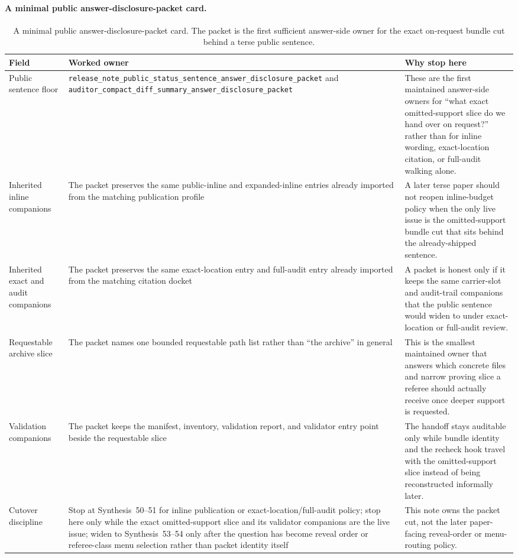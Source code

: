 \documentclass[11pt]{article}
\begin{document}
\paragraph{A minimal public answer-disclosure-packet card.}
\begin{table}[t]
\centering
\small
\begin{tabularx}{\linewidth}{@{}lX X@{}}
\toprule
Field & Worked owner & Why stop here \\
\midrule
Public sentence floor & \nolinkurl{release_note_public_status_sentence_answer_disclosure_packet} and \nolinkurl{auditor_compact_diff_summary_answer_disclosure_packet} & These are the first maintained answer-side owners for ``what exact omitted-support slice do we hand over on request?'' rather than for inline wording, exact-location citation, or full-audit walking alone. \\
Inherited inline companions & The packet preserves the same public-inline and expanded-inline entries already imported from the matching publication profile & A later terse paper should not reopen inline-budget policy when the only live issue is the omitted-support bundle cut that sits behind the already-shipped sentence. \\
Inherited exact and audit companions & The packet preserves the same exact-location entry and full-audit entry already imported from the matching citation docket & A packet is honest only if it keeps the same carrier-slot and audit-trail companions that the public sentence would widen to under exact-location or full-audit review. \\
Requestable archive slice & The packet names one bounded requestable path list rather than ``the archive'' in general & This is the smallest maintained owner that answers which concrete files and narrow proving slice a referee should actually receive once deeper support is requested. \\
Validation companions & The packet keeps the manifest, inventory, validation report, and validator entry point beside the requestable slice & The handoff stays auditable only while bundle identity and the recheck hook travel with the omitted-support slice instead of being reconstructed informally later. \\
Cutover discipline & Stop at Synthesis~50--51 for inline publication or exact-location/full-audit policy; stop here only while the exact omitted-support slice and its validator companions are the live issue; widen to Synthesis~53--54 only after the question has become reveal order or referee-class menu selection rather than packet identity itself & This note owns the packet cut, not the later paper-facing reveal-order or menu-routing policy. \\
\bottomrule
\end{tabularx}
\caption{A minimal public answer-disclosure-packet card. The packet is the first sufficient answer-side owner for the exact on-request bundle cut behind a terse public sentence.}
\label{tab:minimal-public-answer-disclosure-packet-card}
\end{table}
\end{document}
